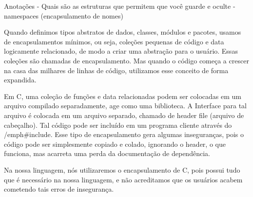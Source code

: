 Anotações
- Quais são as estruturas que permitem que você guarde e oculte
- namespaces (encapsulamento de nomes)

Quando definimos tipos abstratos de dados, classes, módulos
e pacotes, usamos de encapsulamentos  mínimos, ou seja, coleções pequenas
de código e data logicamente relacionado, de modo a criar uma abstração 
para o usuário. Essas coleções são chamadas de encapsulamento.
Mas quando o código começa a crescer na casa das milhares de linhas de
código, utilizamos esse conceito de forma expandida. 

Em C, uma coleção de funções e data relacionadas podem ser colocadas em 
um arquivo compilado separadamente, age como uma biblioteca. A Interface
 para tal arquivo é colocada em um arquivo separado, chamado de header 
file (arquivo de cabeçalho). Tal código pode ser incluído em um programa cliente através do 
/emph{#include}. Esse tipo de encapsulamento gera algumas inseguranças,
pois o código pode ser simplesmente copiado e colado, ignorando o header,
o que funciona, mas acarreta uma perda da documentação de dependência. 

Na nossa linguagem, nós utilizaremos o encapsulamento de C, pois possui tudo que é necessário na nossa linguagem, e não acreditamos que os usuários acabem cometendo tais erros de insegurança.